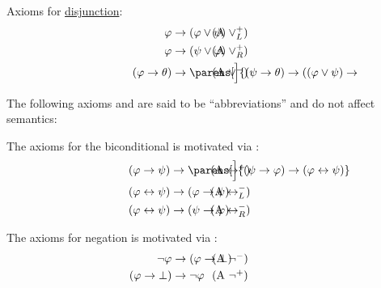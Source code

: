 \begin{definition}
\begin{thmenum}[series=def:minimal_propositional_derivation_system]
     Axioms for \hyperref[def:propositional_language/connectives/disjunction]{disjunction}:
    \begin{align}
      \mathllap{ \varphi }                      &\rightarrow \mathrlap{ (\varphi \vee \psi) } \tag{\textrm{A} \( \vee_L^+ \)} \label{eq:def:minimal_propositional_derivation_system/or/intro_left} \\
      \mathllap{ \varphi }                      &\rightarrow \mathrlap{ (\psi \vee \varphi) } \tag{\textrm{A} \( \vee_R^+ \)} \label{eq:def:minimal_propositional_derivation_system/or/intro_right} \\
      \mathllap{ (\varphi \rightarrow \theta) } &\rightarrow \mathrlap{ \parens[\Big]{ (\psi \rightarrow \theta) \rightarrow ((\varphi \vee \psi) \rightarrow \theta) } } \tag{\textrm{A} \( \vee^- \)} \label{eq:def:minimal_propositional_derivation_system/or/elim}
    \end{align}
  \end{thmenum}

  The following axioms and are said to be \enquote{abbreviations} and do not affect semantics:
  \begin{thmenum}[resume=def:minimal_propositional_derivation_system]
     The axioms for the biconditional is motivated via :
    \begin{align}
      \mathllap{ (\varphi \rightarrow \psi)     } &\rightarrow \mathrlap{ \parens[\Big]{ (\psi \rightarrow \varphi) \rightarrow (\varphi \leftrightarrow \psi) } } \tag{\textrm{A} \( \leftrightarrow^+ \)} \label{def:minimal_propositional_derivation_system/iff/intro} \\
      \mathllap{ (\varphi \leftrightarrow \psi)  }&\rightarrow \mathrlap{ (\varphi \rightarrow \psi) } \tag{\textrm{A} \( \leftrightarrow_L^- \)} \label{eq:def:minimal_propositional_derivation_system/iff/elim_left} \\
      \mathllap{ (\varphi \leftrightarrow \psi) } &\rightarrow \mathrlap{ (\psi \rightarrow \varphi) } \tag{\textrm{A} \( \leftrightarrow_R^- \)} \label{eq:def:minimal_propositional_derivation_system/iff/elim_right}
    \end{align}

     The axioms for negation is motivated via :
    \begin{align}
      \mathllap{ \neg \varphi }               &\rightarrow \mathrlap{ (\varphi \rightarrow \bot) } \tag{\textrm{A} \( \neg^- \)} \label{eq:def:minimal_propositional_derivation_system/neg/elim} \\
      \mathllap{ (\varphi \rightarrow \bot) } &\rightarrow \mathrlap{ \neg \varphi } \tag{\textrm{A} \( \neg^+ \)} \label{eq:def:minimal_propositional_derivation_system/neg/intro}
    \end{align}
  \end{thmenum}
\end{definition}

